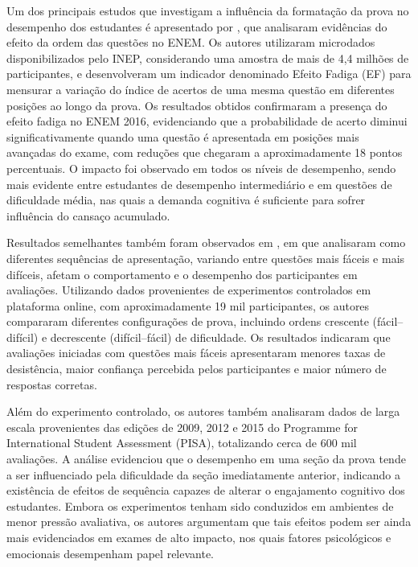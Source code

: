 \documentclass[a4paper,10pt, twocolumn]{article}
\begin{document}
Um dos principais estudos que investigam a influência da formatação da prova no desempenho dos estudantes é apresentado por \textcite{Barichello2022}, que analisaram evidências do efeito da ordem das questões no ENEM. Os autores utilizaram microdados disponibilizados pelo INEP, considerando uma amostra de mais de 4,4 milhões de participantes, e desenvolveram um indicador denominado Efeito Fadiga (EF) para mensurar a variação do índice de acertos de uma mesma questão em diferentes posições ao longo da prova. Os resultados obtidos confirmaram a presença do efeito fadiga no ENEM 2016, evidenciando que a probabilidade de acerto diminui significativamente quando uma questão é apresentada em posições mais avançadas do exame, com reduções que chegaram a aproximadamente 18 pontos percentuais. O impacto foi observado em todos os níveis de desempenho, sendo mais evidente entre estudantes de desempenho intermediário e em questões de dificuldade média, nas quais a demanda cognitiva é suficiente para sofrer influência do cansaço acumulado. 

Resultados semelhantes também foram observados em \textcite{Anaya2023}, em que analisaram como diferentes sequências de apresentação, variando entre questões mais fáceis e mais difíceis, afetam o comportamento e o desempenho dos participantes em avaliações. Utilizando dados provenientes de experimentos controlados em plataforma online, com aproximadamente 19 mil participantes, os autores compararam diferentes configurações de prova, incluindo ordens crescente (fácil–difícil) e decrescente (difícil–fácil) de dificuldade. Os resultados indicaram que avaliações iniciadas com questões mais fáceis apresentaram menores taxas de desistência, maior confiança percebida pelos participantes e maior número de respostas corretas.

Além do experimento controlado, os autores também analisaram dados de larga escala provenientes das edições de 2009, 2012 e 2015 do Programme for International Student Assessment (PISA), totalizando cerca de 600 mil avaliações. A análise evidenciou que o desempenho em uma seção da prova tende a ser influenciado pela dificuldade da seção imediatamente anterior, indicando a existência de efeitos de sequência capazes de alterar o engajamento cognitivo dos estudantes. Embora os experimentos tenham sido conduzidos em ambientes de menor pressão avaliativa, os autores argumentam que tais efeitos podem ser ainda mais evidenciados em exames de alto impacto, nos quais fatores psicológicos e emocionais desempenham papel relevante.
\end{document}
